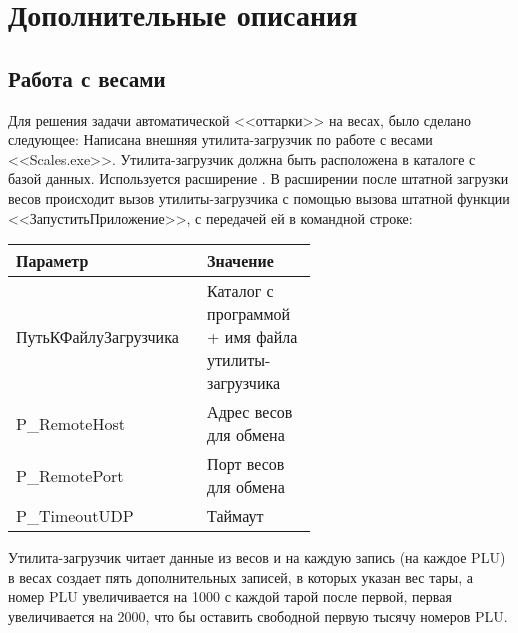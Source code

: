 \section{Дополнительные описания}

\subsection{Работа с весами}\label{1001}

Для решения задачи автоматической <<оттарки>> на весах, было сделано следующее:
Написана внешняя утилита-загрузчик по работе с весами <<Scales.exe>>. Утилита-загрузчик должна быть расположена в каталоге с базой данных.
Используется расширение .
В расширении после штатной загрузки весов происходит вызов  утилиты-загрузчика с помощью вызова штатной функции <<ЗапуститьПриложение>>, с передачей ей в командной строке:
\vspace{\baselineskip}

\begin{tabular}{p{0.3\linewidth}p{0.3\linewidth}}
	\toprule
	Параметр & Значение \\
	\midrule
	ПутьКФайлуЗагрузчика & Каталог с программой + имя файла утилиты-загрузчика \\
	 P\_RemoteHost & Адрес весов для обмена \\
	 P\_RemotePort  & Порт весов для обмена \\
	 P\_TimeoutUDP  & Таймаут \\
	\bottomrule %
\end{tabular}


\vspace{\baselineskip}

Утилита-загрузчик читает данные из весов и на каждую запись (на каждое PLU) в весах создает пять дополнительных записей, в которых указан вес тары, а номер PLU увеличивается на 1000 с каждой тарой после первой, первая увеличивается на 2000, что бы оставить свободной первую тысячу номеров PLU.

